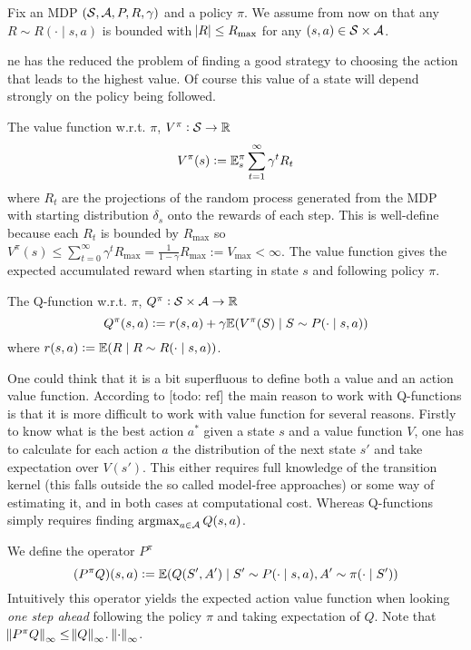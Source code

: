\documentclass{article}
\begin{document}
Fix an MDP $(\mathcal{S}, \mathcal{A}, P, R, \gamma)$ and a policy $\pi$.
We assume from now on that any $R \sim R(\cdot \mid s, a)$ is bounded
with $\abs{R} \leq R_{\max}$ for any $(s,a) \in \mathcal{S} \times \mathcal{A}$.

ne has the reduced the problem of finding a good strategy
to choosing the action that leads to the
highest value. Of course this value of a state will depend
strongly on the policy being followed. 

The  value function
w.r.t. $\pi$,
$V^\pi : \mathcal{S} \to \mathbb{R}$
\[ V^\pi(s) \vcentcolon= \mathbb{E}^\pi_s \sum_{t = 1}^\infty \gamma^t R_t \]
where $R_t$ are the projections of the random process generated from the
MDP with starting distribution $\delta_s$ onto the rewards of each step.
This is well-define because each $R_t$ is bounded by $R_{\max}$ so
$V^{\pi}(s) \leq \sum_{t=0}^\infty \gamma^t R_{\max}
= \frac{1}{1-\gamma} R_{\max} := V_{\max} < \infty $.
The value function gives the expected 
accumulated reward when starting in state $s$ and following policy $\pi$.

The  Q-function 
w.r.t. $\pi$,
$Q^\pi : \mathcal{S} \times \mathcal{A} \to \mathbb{R}$
\[ Q^\pi(s, a) \vcentcolon= r(s, a) +
\gamma \mathbb{E} (V^\pi(S) \mid S \sim P(\cdot \mid s, a)) \]
where $r(s,a) \vcentcolon= \mathbb{E}(R \mid R \sim R(\cdot \mid s, a))$.

One could think that it is a bit superfluous to define both a value and an
action value function. 
According to [todo: ref] the main reason to work with Q-functions
is that it is more difficult to work with value function for several reasons.
Firstly to know what is the best action $a^*$ given a state $s$
and a value function $V$, one has to calculate for each action $a$
the distribution of the next state $s'$ and take expectation over
$V(s')$. This either requires full knowledge of the transition kernel
(this falls outside the so called model-free approaches)
or some way of estimating it, and in both cases at computational cost.
Whereas Q-functions simply requires finding
$\operatorname*{argmax}_{a \in \mathcal{A}} Q(s,a)$.

We define the operator $P^\pi$
\[ (P^\pi Q)(s, a) \vcentcolon= \mathbb{E} (Q(S', A') \mid S' \sim P(\cdot \mid s, a),
A' \sim \pi(\cdot \mid S')) \]
Intuitively this operator yields the expected action value function
when looking \emph{one step ahead} following the policy $\pi$ and taking
expectation of $Q$.
Note that $\norm{P^\pi Q}_\infty \leq \norm{Q}_\infty$.
$\norm{\cdot}_\infty$.
\end{document}
